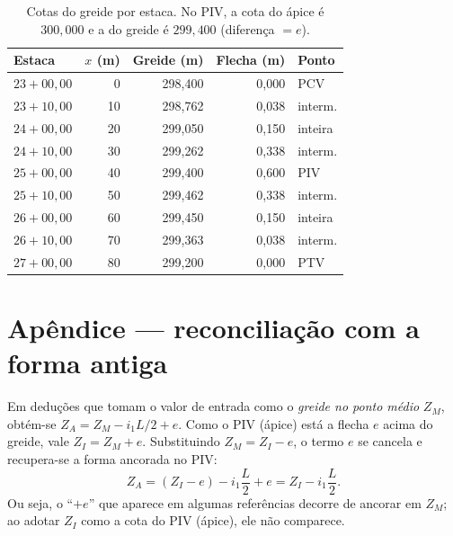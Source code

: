 \documentclass[11pt,a4paper]{article}
\begin{document}
\begin{table}[h]
\centering
\begin{tabular}{lrrrl}
\toprule
Estaca & $x$ (m) & Greide (m) & Flecha (m) & Ponto \\
\midrule
$23+00{,}00$ &  0 & 298{,}400 & 0{,}000 & PCV \\
$23+10{,}00$ & 10 & 298{,}762 & 0{,}038 & interm. \\
$24+00{,}00$ & 20 & 299{,}050 & 0{,}150 & inteira \\
$24+10{,}00$ & 30 & 299{,}262 & 0{,}338 & interm. \\
$25+00{,}00$ & 40 & 299{,}400 & 0{,}600 & PIV \\
$25+10{,}00$ & 50 & 299{,}462 & 0{,}338 & interm. \\
$26+00{,}00$ & 60 & 299{,}450 & 0{,}150 & inteira \\
$26+10{,}00$ & 70 & 299{,}363 & 0{,}038 & interm. \\
$27+00{,}00$ & 80 & 299{,}200 & 0{,}000 & PTV \\
\bottomrule
\end{tabular}
\caption{Cotas do greide por estaca. No PIV, a cota do ápice é $300{,}000$ e a do
greide é $299{,}400$ (diferença $=e$).}
\end{table}

\section*{Apêndice --- reconciliação com a forma antiga}

Em deduções que tomam o valor de entrada como o \emph{greide no ponto médio}
$Z_M$, obtém-se $Z_A = Z_M - i_1 L/2 + e$. Como o PIV (ápice) está a flecha $e$
acima do greide, vale $Z_I = Z_M + e$. Substituindo $Z_M = Z_I - e$, o termo $e$
se cancela e recupera-se a forma ancorada no PIV:
\[
Z_A = (Z_I - e) - i_1\frac{L}{2} + e = Z_I - i_1\frac{L}{2}.
\]
Ou seja, o ``$+e$'' que aparece em algumas referências decorre de ancorar em $Z_M$;
ao adotar $Z_I$ como a cota do PIV (ápice), ele não comparece.
\end{document}

